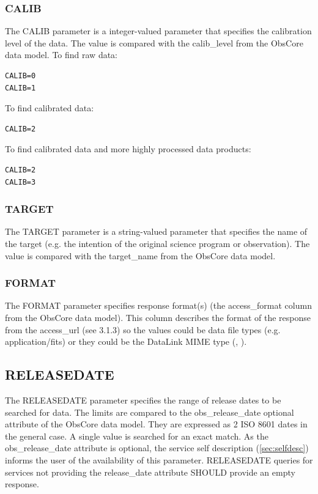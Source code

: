 \documentclass[11pt,a4paper]{ivoa}
\begin{document}
\subsubsection{CALIB}
The CALIB parameter is a integer-valued parameter that specifies the calibration level of the data. The value is compared with the calib\_level from the ObsCore data model. To find raw data:

\begin{lstlisting}
CALIB=0
CALIB=1
\end{lstlisting}
To find calibrated data:

\begin{lstlisting}
CALIB=2
\end{lstlisting}
To find calibrated data and more highly processed data products:

\begin{lstlisting}
CALIB=2
CALIB=3
\end{lstlisting}

\subsubsection{TARGET}
The TARGET parameter is a string-valued parameter that specifies the name of the target (e.g. the intention of the original science program or observation). The value is compared with the target\_name from the ObsCore data model.

\subsubsection{FORMAT}
The FORMAT parameter specifies response format(s)  (the access\_format column from the ObsCore data model). This column describes the format of the response from the access\_url (see 3.1.3) so the values could be data file types (e.g. application/fits) or they could be the DataLink  MIME type (\cite{std:DataLink}, \cite{std:TSV}).  

\subsection{RELEASEDATE}
The RELEASEDATE parameter specifies the range of release dates to be searched for data. 
The limits are compared to the obs\_release\_date optional attribute of the ObsCore data model. 
They are expressed as 2 ISO 8601 dates in the general case. A single value is searched for an exact match.
As the obs\_release\_date attribute is optional, the service self description (\ref{sec:selfdesc})  informs the user of the availability of this parameter.
RELEASEDATE queries for services not providing the release\_date attribute SHOULD provide an empty response.
\end{document}
